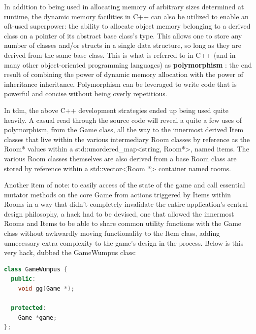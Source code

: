 \documentclass[man,12pt]{apa6}
\begin{document}
In addition to being used in allocating memory of arbitrary sizes determined
at runtime, the dynamic memory facilities in C++ can also be utilized to enable
an oft-used superpower: the ability to allocate object memory belonging to a
derived class on a pointer of its abstract base class's type.  This allows one
to store any number of \textsf{class}es and/or \textsf{struct}s in a single
data structure, so long as they are derived from the same base class.  This is 
what is referred to in C++ (and in many other
object-oriented programming\parencite{digms} languages) as \textbf{polymorphism}
\parencite{poly-tut}: the end result of combining the power of dynamic memory
allocation with the power of inheritance
inheritance\parencite{inh-g4g}.  Polymorphism can be leveraged to write code
that is powerful and concise without being overly repetitious.

In \textsf{tdm}, the above C++ development strategies ended up being used quite
heavily.  A casual
read through the source code will reveal a quite a few uses of polymorphism, from the
\textsf{Game} class, all the way to the innermost derived \textsf{Item} classes
that live within the various intermediary \textsf{Room} classes by reference as
the \textsf{Room*} values within a \textsf{std::unordered\_map<string, Room*>},
named \textsf{items}.  The various \textsf{Room} classes themselves are also
derived from a base \textsf{Room} class are stored by reference within a
\textsf{std::vector<Room *>} container named \textsf{rooms}.

Another item of note: to easily access of the state of the game and call essential
mutator methods on the core \textsf{Game} from actions triggered by \textsf{Item}s within
\textsf{Room}s in a way that didn't completely invalidate the entire application's central
design philosophy, a
hack had to be devised, one that allowed the innermost \textsf{Room}s and
\textsf{Item}s to be able to share common utility functions with the
\textsf{Game} class without awkwardly moving functionality to the
\textsf{Item} class, adding unnecessary extra complexity to the game's design in
the process.
Below is this very hack, dubbed the \textsf{GameWumpus} class:

\begin{framed}
\begin{lstlisting}[language=C++]
class GameWumpus {
  public:
    void gg(Game *);

  protected:
    Game *game;
};
\end{lstlisting}
\end{framed}
\end{document}
